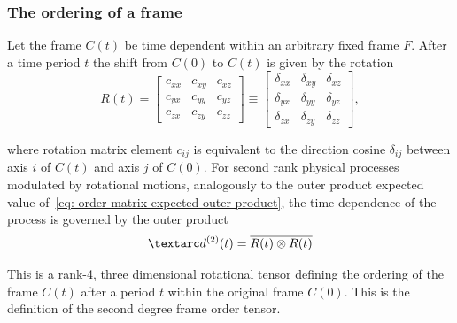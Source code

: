 
\subsubsection{The ordering of a frame}

Let the frame $C(t)$ be time dependent within an arbitrary fixed frame $F$.
After a time period $t$ the shift from $C(0)$ to $C(t)$ is given by the rotation
\begin{equation}
    R(t) = \begin{bmatrix}
               c_{xx} & c_{xy} & c_{xz} \\
               c_{yx} & c_{yy} & c_{yz} \\
               c_{zx} & c_{zy} & c_{zz}
           \end{bmatrix}
         \equiv \begin{bmatrix}
               \delta_{xx} & \delta_{xy} & \delta_{xz} \\
               \delta_{yx} & \delta_{yy} & \delta_{yz} \\
               \delta_{zx} & \delta_{zy} & \delta_{zz}
           \end{bmatrix} ,
\end{equation}

where rotation matrix element $c_{ij}$ is equivalent to the direction cosine $\delta_{ij}$ between axis $i$ of $C(t)$ and axis $j$ of $C(0)$.
For second rank physical processes modulated by rotational motions, analogously to the outer product expected value of~\ref{eq: order matrix expected outer product}, the time dependence of the process is governed by the outer product
\begin{equation} \label{eq: 2nd degree frame order definition}
    \FOtwo(t) = \overline{R(t) \otimes R(t)}
\end{equation}

This is a rank-4, three dimensional rotational tensor defining the ordering of the frame $C(t)$ after a period $t$ within the original frame $C(0)$.
This is the definition of the second degree frame order tensor.

